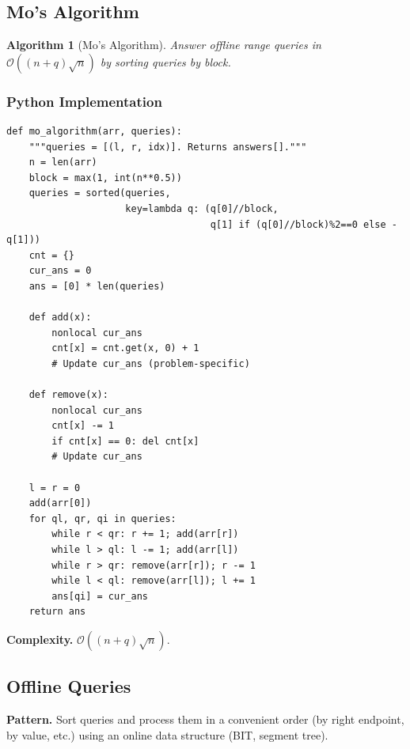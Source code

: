 \documentclass[10pt,a4paper]{article}
\theoremstyle{cpstyle}
\newtheorem{algorithm}[theorem]{Algorithm}
\newcommand{\bigO}[1]{\mathcal{O}\!\left(#1\right)}
\begin{document}
\subsection{Mo's Algorithm}

\begin{algorithm}[Mo's Algorithm]
Answer offline range queries in $\bigO{(n+q)\sqrt{n}}$ by sorting queries by block.
\end{algorithm}

\subsubsection{Python Implementation}
\begin{lstlisting}[caption={Mo's Algorithm for offline range queries}]
def mo_algorithm(arr, queries):
    """queries = [(l, r, idx)]. Returns answers[]."""
    n = len(arr)
    block = max(1, int(n**0.5))
    queries = sorted(queries,
                     key=lambda q: (q[0]//block,
                                    q[1] if (q[0]//block)%2==0 else -q[1]))
    cnt = {}
    cur_ans = 0
    ans = [0] * len(queries)

    def add(x):
        nonlocal cur_ans
        cnt[x] = cnt.get(x, 0) + 1
        # Update cur_ans (problem-specific)

    def remove(x):
        nonlocal cur_ans
        cnt[x] -= 1
        if cnt[x] == 0: del cnt[x]
        # Update cur_ans

    l = r = 0
    add(arr[0])
    for ql, qr, qi in queries:
        while r < qr: r += 1; add(arr[r])
        while l > ql: l -= 1; add(arr[l])
        while r > qr: remove(arr[r]); r -= 1
        while l < ql: remove(arr[l]); l += 1
        ans[qi] = cur_ans
    return ans
\end{lstlisting}

\textbf{Complexity.} $\bigO{(n+q)\sqrt{n}}$.

\subsection{Offline Queries}

\textbf{Pattern.} Sort queries and process them in a convenient order (by right endpoint, by value, etc.) using an online data structure (BIT, segment tree).
\end{document}
